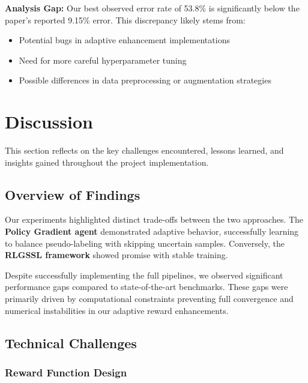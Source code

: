\documentclass{scrartcl}
\begin{document}
\textbf{Analysis Gap:} Our best observed error rate of 53.8\% is significantly below the paper's reported 9.15\% error. This discrepancy likely stems from:
\begin{itemize}
    \item Potential bugs in adaptive enhancement implementations
    \item Need for more careful hyperparameter tuning
    \item Possible differences in data preprocessing or augmentation strategies
\end{itemize}



\section{Discussion}

This section reflects on the key challenges encountered, lessons learned, and insights gained throughout the project implementation.

\subsection{Overview of Findings}
Our experiments highlighted distinct trade-offs between the two approaches. The \textbf{Policy Gradient agent} demonstrated adaptive behavior, successfully learning to balance pseudo-labeling with skipping uncertain samples. Conversely, the \textbf{RLGSSL framework} showed promise with stable training.

Despite successfully implementing the full pipelines, we observed significant performance gaps compared to state-of-the-art benchmarks. These gaps were primarily driven by computational constraints preventing full convergence and numerical instabilities in our adaptive reward enhancements.

\subsection{Technical Challenges}

\subsubsection{Reward Function Design}
\end{document}
